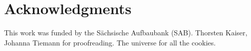 \documentclass[preprint,3p,times,twocolumn]{elsarticle}
\begin{document}



\section*{Acknowledgments}

This work was funded by the S\"achsische Aufbaubank (SAB).
Thorsten Kaiser, Johanna Tiemann for proofreading.
The universe for all the cookies.




\end{document}
